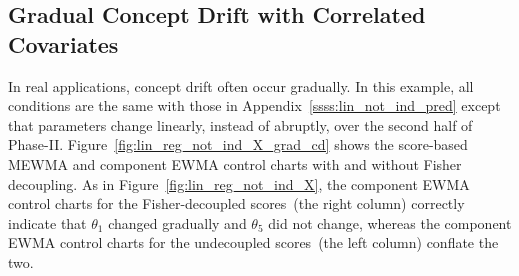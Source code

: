 \documentclass[twoside,11pt]{article}
\begin{document}
\begin{appendices}
\subsection{Gradual Concept Drift with Correlated Covariates}
\label{ssss:lin_not_ind_pred_grad_cd}
In real applications, concept drift often occur gradually. In this example, all conditions are the same with those in Appendix~\ref{ssss:lin_not_ind_pred} except that parameters change linearly, instead of abruptly, over the second half of Phase-II. Figure~\ref{fig:lin_reg_not_ind_X_grad_cd} shows the score-based MEWMA and component EWMA control charts with and without Fisher decoupling. As in Figure~\ref{fig:lin_reg_not_ind_X}, the component EWMA control charts for the Fisher-decoupled scores~(the right column) correctly indicate that $\theta_1$ changed gradually and $\theta_5$ did not change, whereas the component EWMA control charts for the undecoupled scores~(the left column) conflate the two.




\end{appendices}
\end{document}
